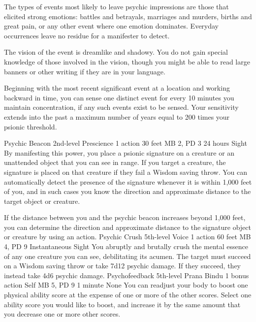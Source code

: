 The types of events most likely to leave psychic impressions
are those that elicited strong emotions: battles and betrayals,
marriages and murders, births and great pain, or any other
event where one emotion dominates. Everyday occurrences leave
no residue for a manifester to detect.

The vision of the event is dreamlike and shadowy. You do not
gain special knowledge of those involved in the vision, though
you might be able to read large banners or other writing if
they are in your language.

Beginning with the most recent significant event at a location
and working backward in time, you can sense one distinct event
for every 10 minutes you maintain concentration, if any such
events exist to be sensed. Your sensitivity extends into the
past a maximum number of years equal to 200 times your psionic
threshold.

\DndPowerHeader%
    {Psychic Beacon\label{pwr:psychic_beacon}}
    {2nd-level Prescience}
    {1 action}
    {30 feet}
    {MB 2, PD 3}
    {24 hours}
    {Sight}
By manifesting this power, you place a psionic signature on a creature
or an unattended object that you can see in range.
If you target a creature, the signature is placed on that creature
if they fail a Wisdom saving throw.
You can automatically detect the presence of the signature
whenever it is within 1,000 feet of you,
and in such cases you know the direction and approximate distance
to the target object or creature.

If the distance between you and the psychic beacon
increases beyond 1,000 feet, you can determine the direction
and approximate distance to the signature object or creature
by using an action.
\DndPowerHeader%
    {Psychic Crush\label{pwr:psychic_crush}}
    {5th-level Voice}
    {1 action}
    {60 feet}
    {MB 4, PD 9}
    {Instantaneous}
    {Sight}
You abruptly and brutally crush
the mental essence of any one creature you can see, debilitating
its acumen. The target must succeed on a Wisdom saving throw
or take 7d12 psychic damage. If they succeed, they instead
take 4d6 psychic damage.
\DndPowerHeader%
    {Psychofeedback\label{pwr:psychofeedback}}
    {5th-level Prana Bindu}
    {1 bonus action}
    {Self}
    {MB 5, PD 9}
    {1 minute}
    {None}
You can readjust your body to boost one physical
ability score at the expense of one or more of the other scores.
Select one ability score you would like to boost, and increase
it by the same amount that you decrease one or more other
scores.

